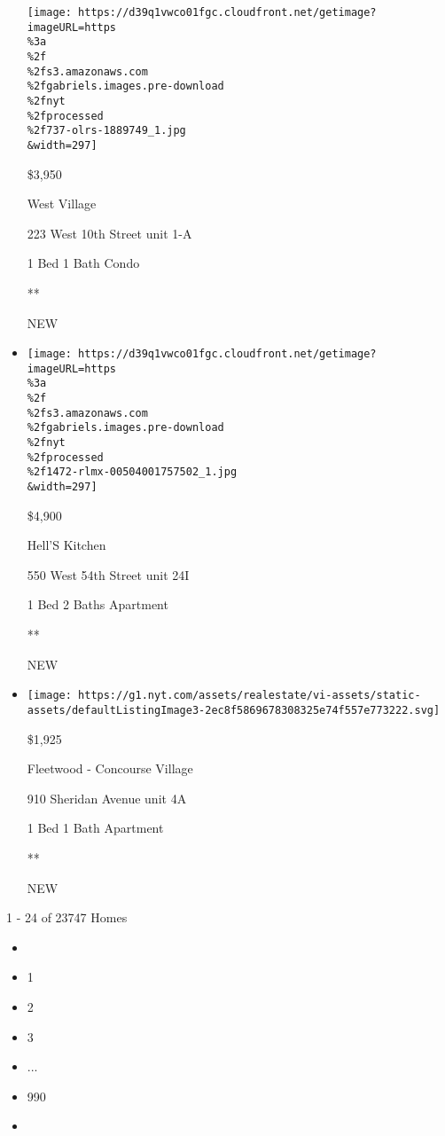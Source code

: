 \begin{itemize}
  \texttt{[image: https://d39q1vwco01fgc.cloudfront.net/getimage?imageURL=https\\\%3a\\\%2f\\\%2fs3.amazonaws.com\\\%2fgabriels.images.pre-download\\\%2fnyt\\\%2fprocessed\\\%2f737-olrs-1889749\_1.jpg\\\&width=297]}

  \$3,950

  West Village

  223 West 10th Street unit 1-A

  1 Bed \textbar{} 1 Bath \textbar{} Condo

  **

  NEW
\item
  \href{/real-estate/usa/ny/new-york/hells-kitchen/homes-for-rent/550-west-54th-street/1472-RLMX-00504001757502?}{}

  \texttt{[image: https://d39q1vwco01fgc.cloudfront.net/getimage?imageURL=https\\\%3a\\\%2f\\\%2fs3.amazonaws.com\\\%2fgabriels.images.pre-download\\\%2fnyt\\\%2fprocessed\\\%2f1472-rlmx-00504001757502\_1.jpg\\\&width=297]}

  \$4,900

  Hell'S Kitchen

  550 West 54th Street unit 24I

  1 Bed \textbar{} 2 Baths \textbar{} Apartment

  **

  NEW
\item
  \href{/real-estate/usa/ny/bronx/fleetwood---concourse-village/homes-for-rent/910-sheridan-avenue/44-6117351?}{}

  \texttt{[image: https://g1.nyt.com/assets/realestate/vi-assets/static-assets/defaultListingImage3-2ec8f5869678308325e74f557e773222.svg]}

  \$1,925

  Fleetwood - Concourse Village

  910 Sheridan Avenue unit 4A

  1 Bed \textbar{} 1 Bath \textbar{} Apartment

  **

  NEW
\end{itemize}

1 - 24 of 23747 Homes

\begin{itemize}
\item
\item
  1
\item
  2
\item
  3
\item
  ...
\item
  990
\item
\end{itemize}

